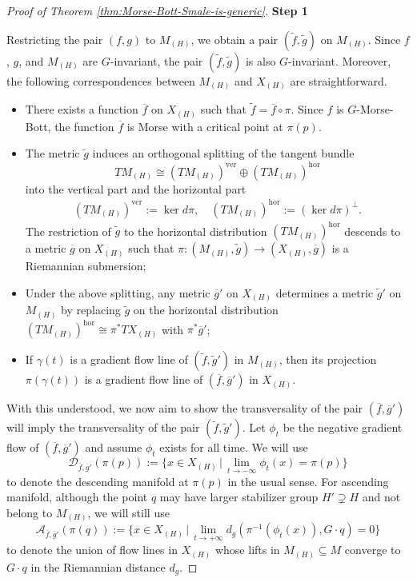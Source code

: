 \documentclass[11pt]{amsart}
\theoremstyle{definition}
\numberwithin{equation}{subsection}
\newcommand{\des}{\mathscr{D}}
\newcommand{\asc}{\mathscr{A}}
\begin{document}
\begin{proof}[Proof of Theorem \ref{thm:Morse-Bott-Smale-is-generic}]
    
\medskip
 \noindent\textbf{Step 1}
 

Restricting the pair $(f,g)$ to $M_{(H)}$, we obtain a pair 
$(\tilde f,\tilde g)$ on $M_{(H)}$. Since $f$, $g$, and $M_{(H)}$ are $G$-invariant, the pair $(\tilde f,\tilde g)$ is also $G$-invariant. Moreover, the following correspondences between $M_{(H)}$ and $X_{(H)}$ are straightforward.
\begin{itemize}
    \item There exists a function $\overline f$ on $X_{(H)}$ such that $\tilde f=\overline f\circ\pi$. Since $f$ is $G$-Morse-Bott, the function $\overline f$ is Morse with a critical point at $\pi(p)$. 
    \item The metric $\tilde{g}$ induces an orthogonal splitting of the tangent bundle \[TM_{(H)}\cong (TM_{(H)})^{\text{ver}}\oplus (TM_{(H)})^{\text{hor}}\] into the vertical part and the horizontal part \begin{gather*}
        (TM_{(H)})^{\text{ver}}:=\ker d\pi, \quad(TM_{(H)})^{\text{hor}}:=(\ker d\pi)^{\perp}.
    \end{gather*} 
     The restriction of $\tilde{g}$ to the horizontal distribution $(TM_{(H)})^{\text{hor}}$ descends to a metric $\overline{g}$ on $X_{(H)}$ such that $\pi:(M_{(H)},\tilde{g})\rightarrow (X_{(H)},\overline{g})$ is a Riemannian submersion;
    \item Under the above splitting, any metric $\overline{g}'$ on $X_{(H)}$ determines a metric $\tilde{g}'$ on $M_{(H)}$ by replacing $\tilde{g}$ on the horizontal distribution $(TM_{(H)})^{\text{hor}}\cong \pi^*TX_{(H)}$ with $\pi^*\overline{g}'$; 
    \item If $\gamma(t)$ is a gradient flow line of $(\tilde{f},\tilde{g}')$ in $M_{(H)}$, then its projection $\pi(\gamma(t))$ is a gradient flow line of $(\overline{f},\overline{g}')$ in $X_{(H)}$. 
\end{itemize}

With this understood, we now aim to show the transversality of the pair $(\overline{f},\overline{g}')$ will imply the transversality of the pair $(\tilde{f},\tilde{g}')$. Let $\phi_t$ be the negative gradient flow of $(\overline{f},\overline{g}')$ and assume $\phi_t$ exists for all time. We will use \[\des_{\overline{f},\overline{g}'}(\pi(p)):=\{x\in X_{(H)}\,|\,\lim_{t\rightarrow-\infty}\phi_t(x)=\pi(p)\}\] to denote the descending manifold at $\pi(p)$ in the usual sense. For ascending manifold, although the point $q$ may have larger stabilizer group $H'\supsetneq H$ and not belong to $M_{(H)}$, we will still use \[\asc_{\overline{f},\overline{g}'}(\pi(q)):=\{x\in X_{(H)}\,|\,\lim_{t\rightarrow+\infty}d_g(\pi^{-1}(\phi_t(x)),G\cdot q)=0\}\]
to denote the union of flow lines in $X_{(H)}$ whose lifts in $M_{(H)}\subseteq M$ converge to $G\cdot q$ in the Riemannian distance $d_g$. 
   


\end{proof}
\end{document}
